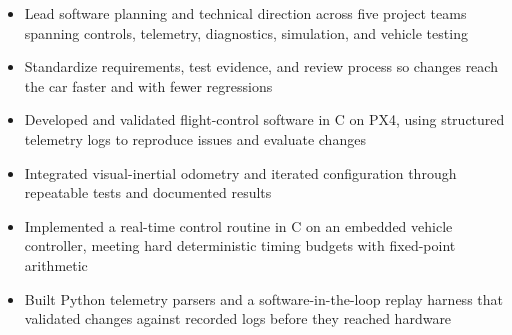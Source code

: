 \documentclass[10pt,letterpaper]{article}
\begin{document}
\bodyfont

\resumeheader
\educationsection




\orgline{\spartanracing}
\begin{itemize}
  \item Lead software planning and technical direction across five project teams spanning controls, telemetry, diagnostics, simulation, and vehicle testing
  \item Standardize requirements, test evidence, and review process so changes reach the car faster and with fewer regressions
\end{itemize}

\entryspace

\begin{itemize}
  \item Developed and validated flight-control software in C on PX4, using structured telemetry logs to reproduce issues and evaluate changes
  \item Integrated visual-inertial odometry and iterated configuration through repeatable tests and documented results
\end{itemize}

\entryspace

\orgline{\spartanracing}
\begin{itemize}
  \item Implemented a real-time control routine in C on an embedded vehicle controller, meeting hard deterministic timing budgets with fixed-point arithmetic
  \item Built Python telemetry parsers and a software-in-the-loop replay harness that validated changes against recorded logs before they reached hardware
\end{itemize}
\end{document}

